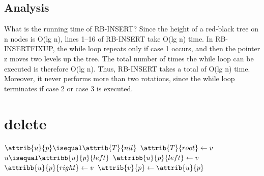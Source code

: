 \documentclass[UTF8,11pt,openany]{ctexbook}
\begin{document}
\subsection{Analysis}
What is the running time of RB-INSERT? Since the height of a red-black tree on n
nodes is O(lg n), lines 1–16 of RB-INSERT take O(lg n) time. In RB-INSERTFIXUP, the while loop repeats only if case 1 occurs, and then the pointer z moves
two levels up the tree. The total number of times the while loop can be executed
is therefore O(lg n). Thus, RB-INSERT takes a total of O(lg n) time. Moreover, it
never performs more than two rotations, since the while loop terminates if case 2
or case 3 is executed.

\newpage
\twocolumn 
\section{delete}
\begin{codebox}
\li    \If $\attrib{u}{p} \isequal \attrib{T}{nil}$
\li        \Then   $\attrib{T}{root} \gets v$
\li    \ElseIf    $u \isequal \attribb{u}{p}{left}$
\li        \Then    $\attribb{u}{p}{left} \gets v$
\li    \Else    $\attribb{u}{p}{right} \gets v$
       \End
\li    $\attrib{v}{p} \gets \attrib{u}{p}$
\end{codebox}

\
\newline
\newline
\newline
\newline
\newline
\newline
\newline
\newline
\newline
\newline
\newline
\newline
\newline
\newline
\
\end{document}
